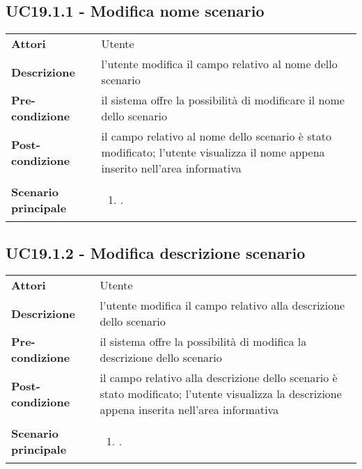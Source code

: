 \subsection{UC19.1.1 - Modifica nome scenario} 
\label{sssec:UC19.1.1} 
\def\arraystretch{1.5}
\begin{tabularx}{\textwidth}{l|p{}}
	\rowcolor{I} \multicolumn{2}{c}{\color{white}\textbf{UC19.1.1 - Modifica nome scenario}} \\
	\toprule
	\endhead
	\textbf{Attori} & Utente\\
	\textbf{Descrizione} & l'utente modifica il campo relativo al nome dello scenario\\
	\textbf{Pre-condizione} & il sistema offre la possibilità di modificare il nome dello scenario\\
	\textbf{Post-condizione} & il campo relativo al nome dello scenario è stato modificato; l'utente visualizza il nome appena inserito nell'area informativa\\
	\textbf{Scenario principale} & \vspace{-1.2em}\begin{enumerate}[leftmargin=*,noitemsep,nosep]
		\item \nameref{sssec:UC19.1.1}.
	\end{enumerate}\\
	\bottomrule
\end{tabularx}
\subsection{UC19.1.2 - Modifica descrizione scenario} 
\label{sssec:UC19.1.2} 
\def\arraystretch{1.5}
\begin{tabularx}{\textwidth}{l|p{}}
	\rowcolor{I} \multicolumn{2}{c}{\color{white}\textbf{UC19.1.2 - Modifica descrizione scenario}} \\
	\toprule
	\endhead
	\textbf{Attori} & Utente\\
	\textbf{Descrizione} & l'utente modifica il campo relativo alla descrizione dello scenario\\
	\textbf{Pre-condizione} & il sistema offre la possibilità di modifica la descrizione dello scenario\\
	\textbf{Post-condizione} & il campo relativo alla descrizione dello scenario  è stato modificato; l'utente visualizza la descrizione appena inserita nell'area informativa\\
	\textbf{Scenario principale} & \vspace{-1.2em}\begin{enumerate}[leftmargin=*,noitemsep,nosep]
		\item \nameref{sssec:UC19.1.2}.
	\end{enumerate}\\
	\bottomrule
\end{tabularx}

